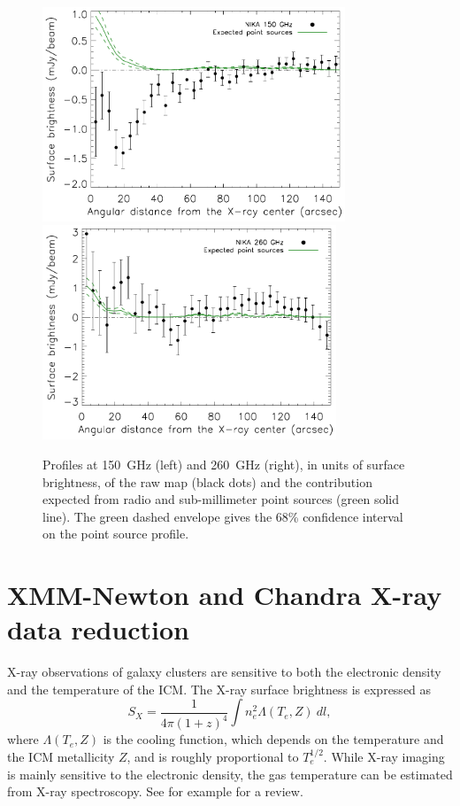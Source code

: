 \documentclass[twocolumn,traditabstract]{aa}
\begin{document}
\begin{figure}[h]
\centering
\includegraphics[height=6.4cm]{Figure/MACSJ1424_profile2mm_plus_ps.pdf}
\includegraphics[height=6.4cm]{Figure/MACSJ1424_profile1mm_plus_ps.pdf}
\caption{\footnotesize Profiles at 150~GHz (left) and 260~GHz (right), in units of surface brightness, of the raw map (black dots) and the contribution expected from radio and sub-millimeter point sources (green solid line). The green dashed envelope gives the 68\% confidence interval on the point source profile.}
\label{fig:flux_profiles}
\end{figure}

\section{XMM-Newton and Chandra X-ray data reduction}\label{sec:XMM_Newton_and_Chandra_X_ray_data_reduction}
X-ray observations of galaxy clusters are sensitive to both the electronic density and the temperature of the ICM. The X-ray surface brightness is expressed as 
\begin{equation}
	S_X = \frac{1}{4 \pi \left(1+z\right)^4} \int n_e^2 \Lambda(T_e, Z) \ dl,
	\label{eq:sx}
\end{equation}
where $\Lambda(T_e,Z)$ is the cooling function, which depends on the temperature and the ICM metallicity $Z$, and is roughly proportional to $T_e^{1/2}$. While X-ray imaging is mainly sensitive to the electronic density, the gas temperature can be estimated from X-ray spectroscopy. See for example \cite{bohringer2010} for a review.
\end{document}
